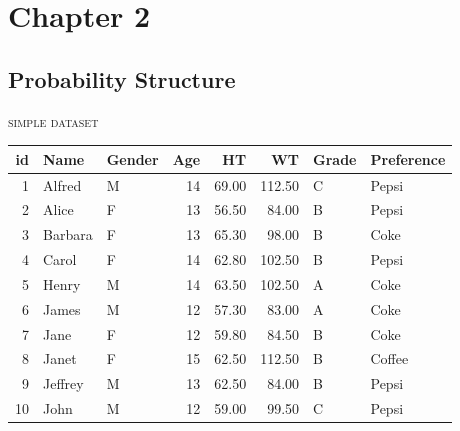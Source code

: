 \documentclass[dvipdfmx, serif,handout]{beamer}
\begin{document}
\begin{frame}
  \titlepage
\end{frame}
\section{Chapter 2}
\subsection{Probability Structure}
\begin{frame}{\textsc{simple dataset}}
\footnotesize
\begin{table}[ht]
\centering
\begin{tabular}{rllrrrll}
  \hline
id & Name & Gender & Age & HT & WT & Grade & Preference \\ 
  \hline
1 & Alfred & M &  14 & 69.00 & 112.50 & C & Pepsi \\ 
  2 & Alice & F &  13 & 56.50 & 84.00 & B & Pepsi \\ 
  3 & Barbara & F &  13 & 65.30 & 98.00 & B & Coke \\ 
  4 & Carol & F &  14 & 62.80 & 102.50 & B & Pepsi \\ 
  5 & Henry & M &  14 & 63.50 & 102.50 & A & Coke \\ 
  6 & James & M &  12 & 57.30 & 83.00 & A & Coke \\ 
  7 & Jane & F &  12 & 59.80 & 84.50 & B & Coke \\ 
  8 & Janet & F &  15 & 62.50 & 112.50 & B & Coffee \\ 
  9 & Jeffrey & M &  13 & 62.50 & 84.00 & B & Pepsi \\ 
  10 & John & M &  12 & 59.00 & 99.50 & C & Pepsi \\ 
   \hline
\end{tabular}
\end{table}


\end{frame}
\end{document}

